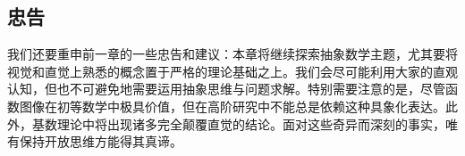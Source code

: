 
\subsection{忠告}

我们还要重申前一章的一些忠告和建议：本章将继续探索抽象数学主题，尤其要将视觉和直觉上熟悉的概念置于严格的理论基础之上。我们会尽可能利用大家的直观认知，但也不可避免地需要运用抽象思维与问题求解。特别需要注意的是，尽管函数图像在初等数学中极具价值，但在高阶研究中不能总是依赖这种具象化表达。此外，基数理论中将出现诸多完全颠覆直觉的结论。面对这些奇异而深刻的事实，唯有保持开放思维方能得其真谛。